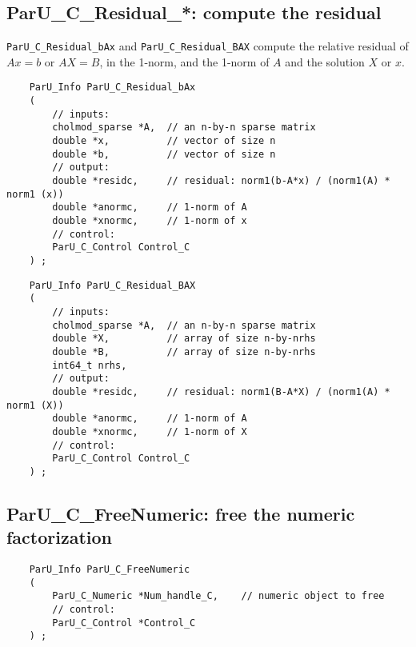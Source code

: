 \documentclass[12pt]{article}
\begin{document}
\subsection{{\sf ParU\_C\_Residual\_*}: compute the residual}

    \verb'ParU_C_Residual_bAx' and \verb'ParU_C_Residual_BAX' compute the
    relative residual of $Ax=b$ or $AX=B$, in the 1-norm, and the 1-norm of $A$
    and the solution $X$ or $x$.

    {\footnotesize
    \begin{verbatim}
    ParU_Info ParU_C_Residual_bAx
    (
        // inputs:
        cholmod_sparse *A,  // an n-by-n sparse matrix
        double *x,          // vector of size n
        double *b,          // vector of size n
        // output:
        double *residc,     // residual: norm1(b-A*x) / (norm1(A) * norm1 (x))
        double *anormc,     // 1-norm of A
        double *xnormc,     // 1-norm of x
        // control:
        ParU_C_Control Control_C
    ) ; \end{verbatim} }

    {\footnotesize
    \begin{verbatim}
    ParU_Info ParU_C_Residual_BAX
    (
        // inputs:
        cholmod_sparse *A,  // an n-by-n sparse matrix
        double *X,          // array of size n-by-nrhs
        double *B,          // array of size n-by-nrhs
        int64_t nrhs,
        // output:
        double *residc,     // residual: norm1(B-A*X) / (norm1(A) * norm1 (X))
        double *anormc,     // 1-norm of A
        double *xnormc,     // 1-norm of X
        // control:
        ParU_C_Control Control_C
    ) ; \end{verbatim} }

\subsection{{\sf ParU\_C\_FreeNumeric}: free the numeric factorization}

    {\footnotesize
    \begin{verbatim}
    ParU_Info ParU_C_FreeNumeric
    (
        ParU_C_Numeric *Num_handle_C,    // numeric object to free
        // control:
        ParU_C_Control *Control_C
    ) ; \end{verbatim} }
\end{document}
